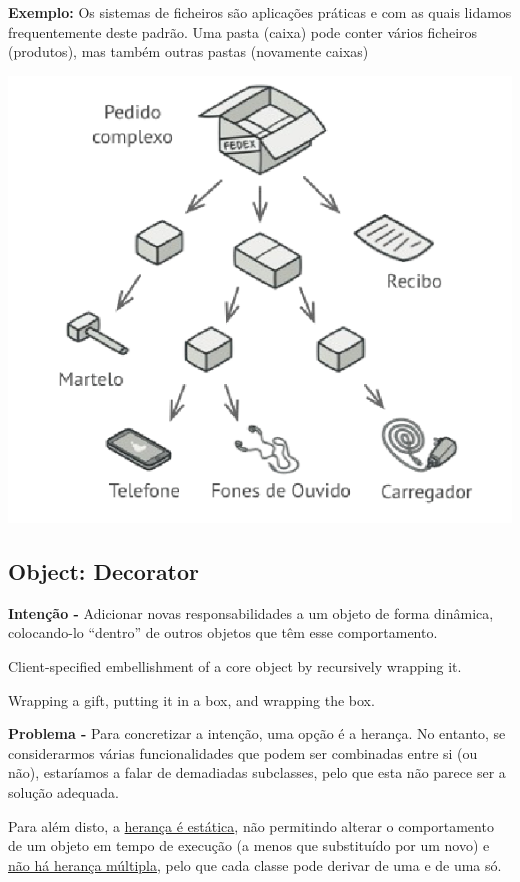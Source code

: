 \documentclass{article}
\begin{document}
\begin{flushleft}
    \textbf{Exemplo:} Os sistemas de ficheiros são aplicações práticas e com as quais lidamos frequentemente deste padrão.
    Uma pasta (caixa) pode conter vários ficheiros (produtos), mas também outras pastas (novamente caixas)

    \begin{center}
        \includegraphics[scale=0.3]{Images/46.png}
    \end{center}
\end{flushleft}

\pagebreak

\subsection{Object: Decorator}

\begin{flushleft}
    \textbf{Intenção -} Adicionar novas responsabilidades a um objeto de forma dinâmica, colocando-lo
    “dentro” de outros objetos que têm esse comportamento.

    Client-specified embellishment of a core object by recursively wrapping it.

    Wrapping a gift, putting it in a box, and wrapping the box.
\end{flushleft}

\begin{flushleft}
    \textbf{Problema -} Para concretizar a intenção, uma opção é a herança. No entanto, se considerarmos
    várias funcionalidades que podem ser combinadas entre si (ou não), estaríamos a
    falar de demadiadas subclasses, pelo que esta não parece ser a solução adequada.
    
    Para além disto, a \uline{herança é estática}, não permitindo alterar o comportamento de
    um objeto em tempo de execução (a menos que substituído por um novo) e \uline{não há
    herança múltipla}, pelo que cada classe pode derivar de uma e de uma só.
\end{flushleft}
\end{document}
